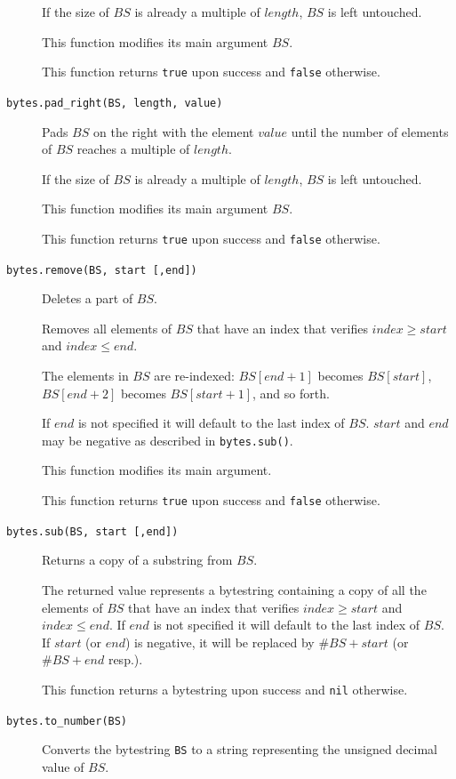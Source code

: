 \documentclass[11pt]{report}
\begin{document}
\begin{description}
{  If the size of $BS$ is already a multiple of $length$, $BS$ is left untouched.

  This function modifies its main argument $BS$.
  
  This function returns \texttt{true} upon success and \texttt{false} otherwise.
}

\item[\texttt{bytes.pad\_right(BS, length, value)}]
{
  Pads $BS$ on the right with the element $value$ until the number of elements 
  of $BS$ reaches a multiple of $length$.

  If the size of $BS$ is already a multiple of $length$, $BS$ is left untouched.

  This function modifies its main argument $BS$.
  
  This function returns \texttt{true} upon success and \texttt{false} otherwise.
}

\item[\texttt{bytes.remove(BS, start [,end])}]
{
  Deletes a part of $BS$.

  Removes all elements of $BS$ that have an index that verifies 
  $index \geq start$ and $index \leq end$.

  The elements in $BS$ are re-indexed: $BS[end+1]$ becomes $BS[start]$,
  $BS[end+2]$ becomes $BS[start+1]$, and so forth.

  If $end$ is not specified it will default to the last index of $BS$.
  $start$ and $end$ may be negative as described in \texttt{bytes.sub()}.

  This function modifies its main argument.
  
  This function returns \texttt{true} upon success and \texttt{false} otherwise.
}

\item[\texttt{bytes.sub(BS, start [,end])}]
{
  Returns a copy of a substring from $BS$.

  The returned value represents a bytestring containing a copy of all the 
  elements of $BS$ that have an index that verifies $index \geq start$ and 
  $index \leq end$.
  If $end$ is not specified it will default to the last index of $BS$.
  If $start$ (or $end$) is negative, it will be replaced by $\#BS+start$
  (or $\#BS+end$ resp.).

  This function returns a bytestring upon success and \texttt{nil} otherwise.
}

\item[\texttt{bytes.to\_number(BS)}]
{
  Converts the bytestring \texttt{BS} to a string representing the unsigned 
  decimal value of $BS$.

}
\end{description}
\end{document}
